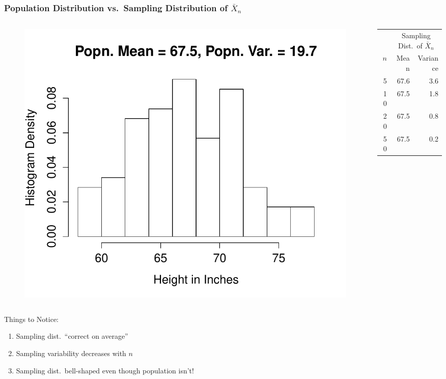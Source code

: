 \begin{frame}
\frametitle{Population Distribution vs.\ Sampling Distribution of $\bar{X}_n$}

\begin{columns} 
\begin{column}[c]{6cm} 

\begin{figure}
\centering
\includegraphics[scale = 0.35]{./images/height_hist}
\end{figure}
\end{column} 
\begin{column}[c]{6cm} 

 \small
\begin{table}
\begin{tabular}{|rrr|}
\hline
&\multicolumn{2}{c|}{Sampling Dist.\ of $\bar{X}_n$}\\
$n$&Mean&Variance\\
\hline
5&67.6&3.6\\
10&67.5&1.8\\
20&67.5&0.8\\
50&67.5&0.2\\
\hline
\end{tabular}
\end{table}

\end{column} 
\end{columns} 
\begin{alertblock}{Things to Notice:}
\begin{enumerate}
	\item Sampling dist.\ ``correct on average'' 
	\item Sampling variability decreases with $n$
  \item Sampling dist.\ bell-shaped even though population isn't!
\end{enumerate}
\end{alertblock}
\end{frame}

